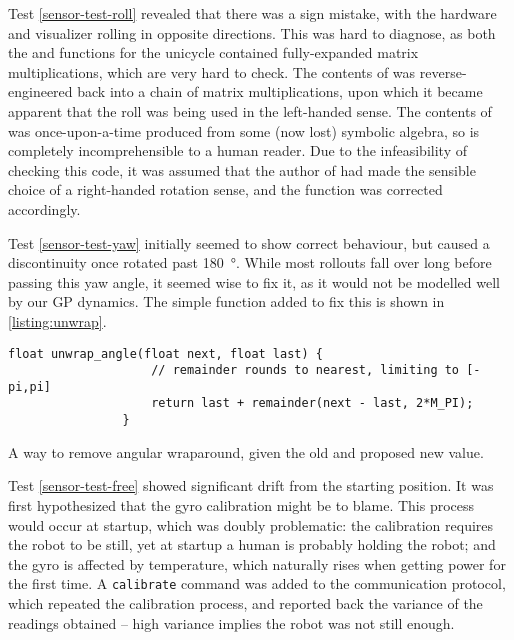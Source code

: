 \documentclass[main.tex]{subfiles}
\begin{document}
		Test \ref{sensor-test-roll} revealed that there was a sign mistake, with the hardware and visualizer rolling in opposite directions.
		This was hard to diagnose, as both the  and  functions for the unicycle contained fully-expanded matrix multiplications, which are very hard to check.
		The contents of  was reverse-engineered back into a chain of matrix multiplications, upon which it became apparent that the roll was being used in the left-handed sense.
		The contents of  was once-upon-a-time produced from some (now lost) symbolic algebra, so is completely incomprehensible to a human reader.
		Due to the infeasibility of checking this code, it was assumed that the author of  had made the sensible choice of a right-handed rotation sense, and the  function was corrected accordingly.

		Test \cref{sensor-test-yaw} initially seemed to show correct behaviour, but caused a discontinuity once rotated past \SI{180}{\degree}.
		While most rollouts fall over long before passing this yaw angle, it seemed wise to fix it, as it would not be modelled well by our GP dynamics.
		The simple function added to fix this is shown in \cref{listing:unwrap}.

		\begin{listingfloat}[b]
			\begin{lstlisting}[language={[11]C++}, gobble=8, frame=single]
				float unwrap_angle(float next, float last) {
					// remainder rounds to nearest, limiting to [-pi,pi]
					return last + remainder(next - last, 2*M_PI);
				}
			\end{lstlisting}
			\caption{A way to remove angular wraparound, given the old and proposed new value.}
			\label{listing:unwrap}
		\end{listingfloat}

		Test \cref{sensor-test-free} showed significant drift from the starting position.
		It was first hypothesized that the gyro calibration might be to blame.
		This process would occur at startup, which was doubly problematic: the calibration requires the robot to be still, yet at startup a human is probably holding the robot; and the gyro is affected by temperature, which naturally rises when getting power for the first time.
		A \texttt{calibrate} command was added to the communication protocol, which repeated the calibration process, and reported back the variance of the readings obtained -- high variance implies the robot was not still enough.
\end{document}

